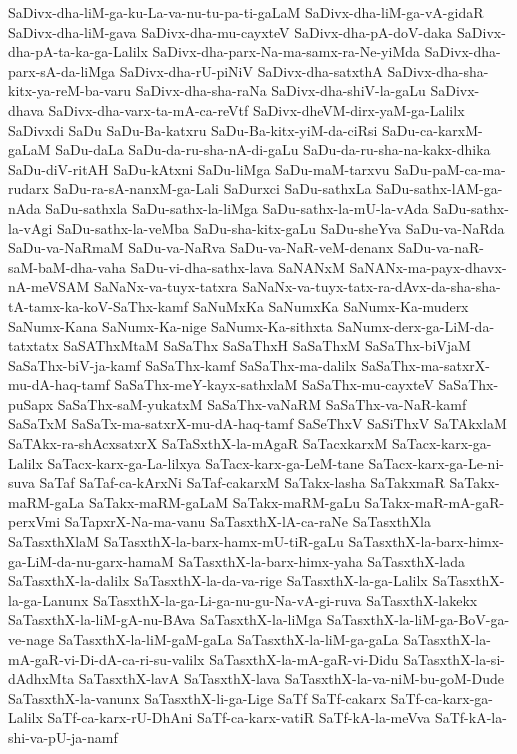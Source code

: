 {SaDivx-dha-liM-ga-ku-La-va-nu-tu-pa-ti-gaLaM
SaDivx-dha-liM-ga-vA-gidaR
SaDivx-dha-liM-gava
SaDivx-dha-mu-cayxteV
SaDivx-dha-pA-doV-daka
SaDivx-dha-pA-ta-ka-ga-Lalilx
SaDivx-dha-parx-Na-ma-samx-ra-Ne-yiMda
SaDivx-dha-parx-sA-da-liMga
SaDivx-dha-rU-piNiV
SaDivx-dha-satxthA
SaDivx-dha-sha-kitx-ya-reM-ba-varu
SaDivx-dha-sha-raNa
SaDivx-dha-shiV-la-gaLu
SaDivx-dhava
SaDivx-dha-varx-ta-mA-ca-reVtf
SaDivx-dheVM-dirx-yaM-ga-Lalilx
SaDivxdi
SaDu
SaDu-Ba-katxru
SaDu-Ba-kitx-yiM-da-ciRsi
SaDu-ca-karxM-gaLaM
SaDu-daLa
SaDu-da-ru-sha-nA-di-gaLu
SaDu-da-ru-sha-na-kakx-dhika
SaDu-diV-ritAH
SaDu-kAtxni
SaDu-liMga
SaDu-maM-tarxvu
SaDu-paM-ca-ma-rudarx
SaDu-ra-sA-nanxM-ga-Lali
SaDurxci
SaDu-sathxLa
SaDu-sathx-lAM-ga-nAda
SaDu-sathxla
SaDu-sathx-la-liMga
SaDu-sathx-la-mU-la-vAda
SaDu-sathx-la-vAgi
SaDu-sathx-la-veMba
SaDu-sha-kitx-gaLu
SaDu-sheYva
SaDu-va-NaRda
SaDu-va-NaRmaM
SaDu-va-NaRva
SaDu-va-NaR-veM-denanx
SaDu-va-naR-saM-baM-dha-vaha
SaDu-vi-dha-sathx-lava
SaNANxM
SaNANx-ma-payx-dhavx-nA-meVSAM
SaNaNx-va-tuyx-tatxra
SaNaNx-va-tuyx-tatx-ra-dAvx-da-sha-sha-tA-tamx-ka-koV-SaThx-kamf
SaNuMxKa
SaNumxKa
SaNumx-Ka-muderx
SaNumx-Kana
SaNumx-Ka-nige
SaNumx-Ka-sithxta
SaNumx-derx-ga-LiM-da-tatxtatx
SaSAThxMtaM
SaSaThx
SaSaThxH
SaSaThxM
SaSaThx-biVjaM
SaSaThx-biV-ja-kamf
SaSaThx-kamf
SaSaThx-ma-dalilx
SaSaThx-ma-satxrX-mu-dA-haq-tamf
SaSaThx-meY-kayx-sathxlaM
SaSaThx-mu-cayxteV
SaSaThx-puSapx
SaSaThx-saM-yukatxM
SaSaThx-vaNaRM
SaSaThx-va-NaR-kamf
SaSaTxM
SaSaTx-ma-satxrX-mu-dA-haq-tamf
SaSeThxV
SaSiThxV
SaTAkxlaM
SaTAkx-ra-shAcxsatxrX
SaTaSxthX-la-mAgaR
SaTacxkarxM
SaTacx-karx-ga-Lalilx
SaTacx-karx-ga-La-lilxya
SaTacx-karx-ga-LeM-tane
SaTacx-karx-ga-Le-ni-suva
SaTaf
SaTaf-ca-kArxNi
SaTaf-cakarxM
SaTakx-lasha
SaTakxmaR
SaTakx-maRM-gaLa
SaTakx-maRM-gaLaM
SaTakx-maRM-gaLu
SaTakx-maR-mA-gaR-perxVmi
SaTapxrX-Na-ma-vanu
SaTasxthX-lA-ca-raNe
SaTasxthXla
SaTasxthXlaM
SaTasxthX-la-barx-hamx-mU-tiR-gaLu
SaTasxthX-la-barx-himx-ga-LiM-da-nu-garx-hamaM
SaTasxthX-la-barx-himx-yaha
SaTasxthX-lada
SaTasxthX-la-dalilx
SaTasxthX-la-da-va-rige
SaTasxthX-la-ga-Lalilx
SaTasxthX-la-ga-Lanunx
SaTasxthX-la-ga-Li-ga-nu-gu-Na-vA-gi-ruva
SaTasxthX-lakekx
SaTasxthX-la-liM-gA-nu-BAva
SaTasxthX-la-liMga
SaTasxthX-la-liM-ga-BoV-ga-ve-nage
SaTasxthX-la-liM-gaM-gaLa
SaTasxthX-la-liM-ga-gaLa
SaTasxthX-la-mA-gaR-vi-Di-dA-ca-ri-su-valilx
SaTasxthX-la-mA-gaR-vi-Didu
SaTasxthX-la-si-dAdhxMta
SaTasxthX-lavA
SaTasxthX-lava
SaTasxthX-la-va-niM-bu-goM-Dude
SaTasxthX-la-vanunx
SaTasxthX-li-ga-Lige
SaTf
SaTf-cakarx
SaTf-ca-karx-ga-Lalilx
SaTf-ca-karx-rU-DhAni
SaTf-ca-karx-vatiR
SaTf-kA-la-meVva
SaTf-kA-la-shi-va-pU-ja-namf
}
